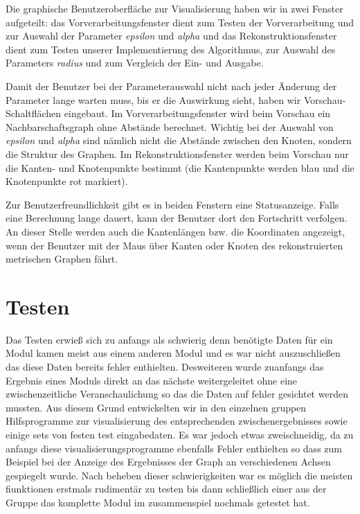 \documentclass[parskip=half,
 fontsize=12pt, bibtotoc,
 ngerman]
 {article}
\begin{document}
Die graphische Benutzeroberfläche zur Visualisierung haben wir in zwei Fenster aufgeteilt: das Vorverarbeitungsfenster dient zum Testen der Vorverarbeitung und zur Auswahl der Parameter \emph{epsilon} und \emph{alpha} und das Rekonstruktionsfenster dient zum Testen unserer Implementierung des Algorithmus, zur Auswahl des Parameters \emph{radius} und zum Vergleich der Ein- und Ausgabe.

Damit der Benutzer bei der Parameterauswahl nicht nach jeder Änderung der Parameter lange warten muss, bis er die Auswirkung sieht, haben wir Vorschau-Schaltflächen eingebaut. Im Vorverarbeitungsfenster wird beim Vorschau ein Nachbarschaftsgraph ohne Abstände berechnet. Wichtig bei der Auswahl von \emph{epsilon} und \emph{alpha} sind nämlich nicht die Abstände zwischen den Knoten, sondern die Struktur des Graphen. Im Rekonstruktionsfenster werden beim Vorschau nur die Kanten- und Knotenpunkte bestimmt (die Kantenpunkte werden blau und die Knotenpunkte rot markiert).

Zur Benutzerfreundlichkeit gibt es in beiden Fenstern eine Statusanzeige. Falls eine Berechnung lange dauert, kann der Benutzer dort den Fortschritt verfolgen. An dieser Stelle werden auch die Kantenlängen bzw. die Koordinaten angezeigt, wenn der Benutzer mit der Maus über Kanten oder Knoten des rekonstruierten metrischen Graphen fährt.

\section{Testen}

Das Testen erwieß sich zu anfangs als schwierig denn benötigte Daten für ein Modul kamen meist aus einem anderen Modul und es war nicht auszuschließen das diese Daten bereits fehler enthielten. Desweiteren wurde zuanfangs das Ergebnis eines Moduls direkt an das nächste weitergeleitet ohne eine zwischenzeitliche Veranschaulichung so das die Daten auf fehler gesichtet werden mussten. Aus diesem Grund entwickelten wir in den einzelnen gruppen Hilfsprogramme zur visualisierung des entsprechenden zwischenergebnisses sowie einige sets von festen test eingabedaten. Es war jedoch etwas zweischneidig, da zu anfangs diese visualisierungsprogramme ebenfalls Fehler enthielten so dass zum Beispiel bei der Anzeige des Ergebnisses der Graph an verschiedenen Achsen gespiegelt wurde. Nach beheben dieser schwierigkeiten war es möglich die meisten fiunktionen erstmals rudimentär zu testen bis dann schließlich einer aus der Gruppe das komplette Modul im zusammenspiel nochmals getestet hat.
\end{document}

